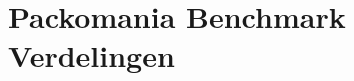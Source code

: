 \documentclass[12pt,a4paper,oneside]{book}
\begin{document}
{%


\newpage






\appendix

\chapter{Packomania Benchmark Verdelingen} \label{append:packomania-benchmark-verdelingen}

}
\end{document}
